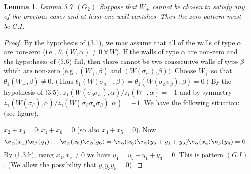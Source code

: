 \documentclass{memo-l}
\newtheorem{lemma}[theorem]{Lemma}
\theoremstyle{definition}
\theoremstyle{remark}
\numberwithin{section}{chapter}
\numberwithin{equation}{chapter}
\begin{document}
{\medskip}

\begin{lemma}{Lemma 3.7}\  $(G_{2})$\  Suppose that $W_{+}$ cannot be chosen to satisfy
any of the previous cases and at least one wall vanishes.
 Then the zero pattern must be $G.I$.
\end{lemma}

\medskip

\begin{proof}    By the hypothesis of (3.1), we may assume that all of the
walls of type ${\alpha}$ are non-zero (i.e.,
${\theta}_{1}(W,{\alpha})\ne 0 {\ \forall\ } W$).
 If the walls of type ${\alpha}$ are non-zero and the hypotheses of (3.6)
fail, then there cannot be two consecutive walls of type ${\beta}$ which are
non-zero (e.g., $(W_{+},{\beta})$ and $(W({\sigma}_{\alpha}),{\beta}))$.
 Choose $W_{+}$ so that ${\theta}_{1}(W_{+},{\beta})\ne 0$.
 (Thus ${\theta}_{1}(W({\sigma}_{\alpha}),{\beta}) =
{\theta}_{1}(W({\sigma}_{\alpha}{\sigma}_{\beta}),{\beta}) = 0.)$  By the
hypothesis of (3.5), $z_{1}(W({\sigma}_{\beta}{\sigma}_{\alpha}),
{\alpha})/z_{1}(W_{+},{\alpha}) = -1$ and by symmetry
$z_{1}(W({\sigma}_{\beta}),{\alpha})/z_{1}
(W({\sigma}_{\beta}{\sigma}_{\alpha}{\sigma}_{\beta}),{\alpha}) = -1$.
 We have the following situation: (see figure). %

\begin{figure}[htb]
\centering
{}
\end{figure}


\noindent
$x_{2}+x_{3} = 0; x_{1}+x_{6} = 0$ (so also $x_{4}+x_{5} = 0$).
 Now
$$
{\e}_{\alpha}(x_{1}){\e}_{\beta}(y_{1})\ldots
{\e}_{\alpha}(x_{6}){\e}_{\beta}(y_6) =
{\e}_{\alpha}(x_{5}){\e}_{\beta}(y_{5}+y_{1}+y_{3})
{\e}_{\alpha}(x_{4}){\e}_{\beta}(y_{4}) = 0 .
$$
By (1.3.b), using $x_{4},x_{5}\ne 0$ we have $y_{4} = y_{5}+y_{1}+y_{3} = 0$.
 This is pattern $(G.I)$.
 (We allow the possibility that $y_{1}y_{3}y_{5} = 0$).
\end{proof}
\end{document}
